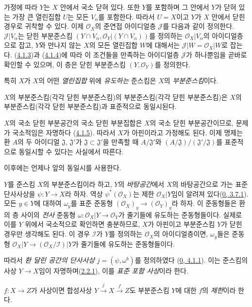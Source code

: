 가정에 따라 $Y$는 $X$ 안에서 국소 닫혀 있다. 또한 $Y$를 포함하며
그 안에서 $Y$가 닫혀 있는 가장 큰 열린집합 $U$는 모든
$V_\alpha$를 포함한다. 따라서 $U=X$이고 $Y$가 $X$ 안에서 닫힌
경우로 귀착할 수 있다. 이제 $\mathscr{O}_X$의 준연접 아이디얼층
$\mathscr{J}$를 다음과 같이 정의한다. $\mathscr{J}|V_\alpha$는 닫힌
부분준스킴
$(Y\cap V_\alpha,\mathscr{O}_Y|(Y\cap V_\alpha))$를 정의하는
$\mathscr{O}_X|V_\alpha$의 아이디얼층으로 잡고, $Y$와 만나지 않는
$X$의 모든 열린집합 $W$에 대해서는
$\mathscr{J}|W=\mathscr{O}_X|W$로 잡는다.
(\hyperref[I.4.1.3-ko]{4.1.3})과
(\hyperref[I.4.1.4-ko]{4.1.4})에 따라 이 조건들을 만족하는
아이디얼층 $\mathscr{J}$가 하나뿐임을 곧바로 확인할 수 있으며, 이
층은 닫힌 부분준스킴 $(Y,\mathscr{O}_Y)$를 정의한다.

특히 $X$가 $X$의 어떤 \emph{열린집합} 위에 \emph{유도하는}
준스킴은 $X$의 \emph{부분준스킴}이다.

\begin{proposition}[4.1.6]
\label{I.4.1.6-ko}
$X$의 부분준스킴(각각 닫힌 부분준스킴)의
부분준스킴(각각 닫힌 부분준스킴)은 $X$의 부분준스킴(각각 닫힌
부분준스킴)과 표준적으로 동일시된다.
\end{proposition}

$X$의 국소 닫힌 부분공간의 국소 닫힌 부분집합은 $X$의 국소 닫힌
부분공간이므로, 문제가 국소적임은 자명하다
(\hyperref[I.4.1.5-ko]{4.1.5}). 따라서 $X$가 아핀이라고 가정해도
된다. 이제 명제는 환 $A$의 두 아이디얼 $\mathfrak{J}$,
$\mathfrak{J}'$가 $\mathfrak{J}\subset\mathfrak{J}'$을 만족할 때
$A/\mathfrak{J}'$와
$(A/\mathfrak{J})/(\mathfrak{J}'/\mathfrak{J})$를 표준적으로
동일시할 수 있다는 사실에서 따른다.

이후에는 언제나 앞의 동일시를 사용한다.

\begin{env}[4.1.7]
\label{I.4.1.7-ko}
$Y$를 준스킴 $X$의 부분준스킴이라 하고, $Y$의 \emph{바탕공간}에서
$X$의 바탕공간으로 가는 표준 단사사상을 $\psi:Y\to X$라 하자.
역상 $\psi^*(\mathscr{O}_X)$는 제한 $\mathscr{O}_X|Y$임이 알려져
있다(\hyperref[0.3.7.1-ko]{0, 3.7.1}). 모든 $y\in Y$에 대하여
$\omega_y$를 표준 준동형
$(\mathscr{O}_X)_y\to(\mathscr{O}_Y)_y$라 하자. 이 준동형들은 환의
층 사이의 \emph{전사} 준동형
$\omega:\mathscr{O}_X|Y\to\mathscr{O}_Y$가 줄기들에 유도하는
준동형들이다. 실제로 이를 $Y$ 위에서 국소적으로 확인하면 충분하므로,
$X$가 아핀이고 부분준스킴 $Y$가 닫힌 경우만 생각해도 된다. 이 경우
$\mathscr{I}$가 $Y$를 정의하는 $\mathscr{O}_X$의 아이디얼층이면,
$\omega_y$들은 준동형
$\mathscr{O}_X|Y\to(\mathscr{O}_X/\mathscr{I})|Y$가 줄기들에
유도하는 준동형들이다.

따라서 \emph{환 달린 공간의 단사사상}
$j=(\psi,\omega^b)$를 정의하였다
(\hyperref[0.4.1.1-ko]{0, 4.1.1}). 이는 준스킴의 사상
$Y\to X$임이 자명하며(\hyperref[I.2.2.1-ko]{2.2.1}), 이를
\emph{표준 포함 사상}이라 한다.

$f:X\to Z$가 사상이면 합성사상
$Y\xrightarrow{j}X\xrightarrow{f}Z$도 부분준스킴 $Y$에 대한
$f$의 \emph{제한}이라 한다.
\end{env}

